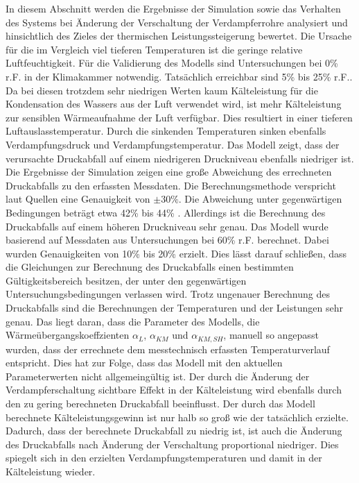 In diesem Abschnitt werden die Ergebnisse der Simulation sowie das Verhalten des Systems bei Änderung der Verschaltung der Verdampferrohre analysiert und hinsichtlich des Zieles der thermischen Leistungssteigerung bewertet.
Die Ursache für die im Vergleich viel tieferen Temperaturen ist die geringe relative Luftfeuchtigkeit.
Für die Validierung des Modells sind Untersuchungen bei \unit{0}{\%} r.F. in der Klimakammer notwendig. Tatsächlich erreichbar sind \unit{5}{\%} bis \unit{25}{\%} r.F.. Da bei diesen trotzdem sehr niedrigen Werten kaum Kälteleistung für die Kondensation des Wassers aus der Luft verwendet wird, ist mehr Kälteleistung zur sensiblen Wärmeaufnahme der Luft verfügbar. Dies resultiert in einer tieferen Luftauslasstemperatur. Durch die sinkenden Temperaturen sinken ebenfalls Verdampfungsdruck und Verdampfungstemperatur. Das Modell zeigt, dass der verursachte Druckabfall auf einem niedrigeren Druckniveau ebenfalls niedriger ist. \newline
Die Ergebnisse der Simulation zeigen eine große Abweichung des errechneten Druckabfalls  zu den erfassten Messdaten. Die Berechnungsmethode verspricht laut Quellen eine Genauigkeit von $\pm 30 \%$. Die Abweichung unter gegenwärtigen Bedingungen beträgt etwa \unit{42}{\%} bis \unit{44}{\%} . Allerdings ist die Berechnung des Druckabfalls auf einem höheren Druckniveau sehr genau. Das Modell wurde basierend auf Messdaten aus Untersuchungen bei \unit{60}{\%} r.F. berechnet. Dabei wurden Genauigkeiten von \unit{10}{\%} bis \unit{20}{\%} erzielt. Dies lässt darauf schließen, dass die Gleichungen zur Berechnung des Druckabfalls einen bestimmten Gültigkeitsbereich besitzen, der unter den gegenwärtigen Untersuchungsbedingungen verlassen wird. \newline
Trotz ungenauer Berechnung des Druckabfalls sind die Berechnungen der Temperaturen und der Leistungen sehr genau. Das liegt daran, dass die Parameter des Modells, die Wärmeübergangskoeffzienten $\alpha_L$, $\alpha_{KM}$ und $\alpha_{KM,SH}$, manuell so angepasst wurden, dass der errechnete dem messtechnisch erfassten Temperaturverlauf entspricht. Dies hat zur Folge, dass das Modell mit den aktuellen Parameterwerten nicht allgemeingültig ist. \newline
Der durch die Änderung der Verdampferschaltung sichtbare Effekt in der Kälteleistung wird ebenfalls durch den zu gering berechneten Druckabfall beeinflusst. Der durch das Modell berechnete Kälteleistungsgewinn ist nur halb so groß wie der tatsächlich erzielte. Dadurch, dass der berechnete Druckabfall zu niedrig ist, ist auch die Änderung des Druckabfalls nach Änderung der Verschaltung proportional niedriger. Dies spiegelt sich in den erzielten Verdampfungstemperaturen und damit in der Kälteleistung wieder.
